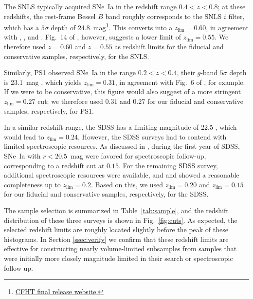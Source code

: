 \documentclass[]{aa}
\begin{document}
The SNLS typically acquired SNe~Ia in the redshift range $0.4<z<0.8$; at these
redshifts, the rest-frame Bessel $B$ band roughly corresponds to the SNLS $i$
filter, which has a $5\sigma$ depth of
24.8~mag\footnote{\href{https://www.cfht.hawaii.edu/Science/CFHTLS/cfhtlsfinalreleaseexecsummary.html}{CFHT
final release website.}}. This converts into a $z_{\lim}=0.60$, in agreement
with \cite{neill2006}, \cite{perrett2010}, and \cite{bazin2011}. Fig.~14 of
\citet[][see their Section~5]{perrett2010}, however, suggests a lower limit of
$z_{\lim}=0.55$. We therefore used $z=0.60$ and $z=0.55$ as redshift limits for
the fiducial and conservative samples, respectively, for the SNLS.

Similarly, PS1 observed SNe~Ia in the range $0.2<z<0.4$, their $g$-band
$5\sigma$ depth is 23.1~mag \citep{rest2014}, which yields $z_{\lim}=0.31$, in
agreement with Fig.~6 of \cite{scolnic2018a}, for example. If we were to be
conservative, this figure would also suggest of a more stringent $z_{\lim}=0.27$
cut; we therefore used $0.31$ and $0.27$ for our fiducial and conservative
samples, respectively, for PS1.

In a similar redshift range, the SDSS has a limiting magnitude of 22.5
\citep{dilday2008, sako2008}, which would lead to $z_{\lim}=0.24$. However, the
SDSS surveys had to contend with limited spectroscopic resources. As discussed
in \citet[][Section~2]{kessler2009}, during the first year of SDSS, SNe~Ia with
$r<20.5$~mag were favored for spectroscopic follow-up, corresponding to a
redshift cut at $0.15$. For the remaining SDSS survey, additional spectroscopic
resources were available, and \cite{kessler2009} and \cite{dilday2008} showed a
reasonable completeness up to $z_{\lim}=0.2$. Based on this, we used
$z_{\lim}=0.20$ and $z_{\lim}=0.15$ for our fiducial and conservative samples,
respectively, for the SDSS.

The sample selection is summarized in Table~\ref{tab:sample}, and the redshift
distribution of these three surveys is shown in Fig.~\ref{fig:cuts}. As
expected, the selected redshift limits are roughly located slightly before the
peak of these histograms. In Section \ref{ssec:verify} we confirm that these
redshift limits are effective for constructing nearly volume-limited subsamples
from samples that were initially more closely magnitude limited in their search
or spectroscopic follow-up.
\end{document}

